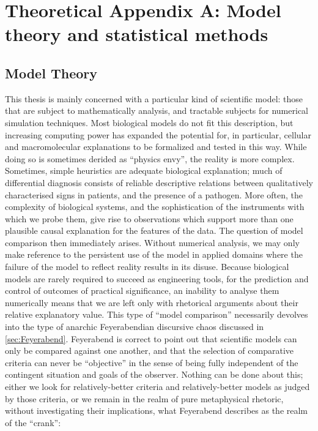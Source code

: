 \chapter{Theoretical Appendix A: Model theory and statistical methods}

\section{Model Theory}
This thesis is mainly concerned with a particular kind of scientific model: those that are subject to mathematically analysis, and tractable subjects for numerical simulation techniques. Most biological models do not fit this description, but increasing computing power has expanded the potential for, in particular, cellular and macromolecular explanations to be formalized and tested in this way. While doing so is sometimes derided as ``physics envy'', the reality is more complex. Sometimes, simple heuristics are adequate biological explanation; much of differential diagnosis consists of reliable descriptive relations between qualitatively characterised signs in patients, and the presence of a pathogen. More often, the complexity of biological systems, and the sophistication of the instruments with which we probe them, give rise to observations which support more than one plausible causal explanation for the features of the data. The question of model comparison then immediately arises. Without numerical analysis, we may only make reference to the persistent use of the model in applied domains where the failure of the model to reflect reality results in its disuse. Because biological models are rarely required to succeed as engineering tools, for the prediction and control of outcomes of practical significance, an inability to analyse them numerically means that we are left only with rhetorical arguments about their relative explanatory value. This type of ``model comparison'' necessarily devolves into the type of anarchic Feyerabendian discursive chaos discussed in \autoref{sec:Feyerabend}. Feyerabend is correct to point out that scientific models can only be compared against one another, and that the selection of comparative criteria can never be ``objective'' in the sense of being fully independent of the contingent situation and goals of the observer. Nothing can be done about this; either we look for relatively-better criteria and relatively-better models as judged by those criteria, or we remain in the realm of pure metaphysical rhetoric, without investigating their implications, what Feyerabend describes as the realm of the ``crank'':

